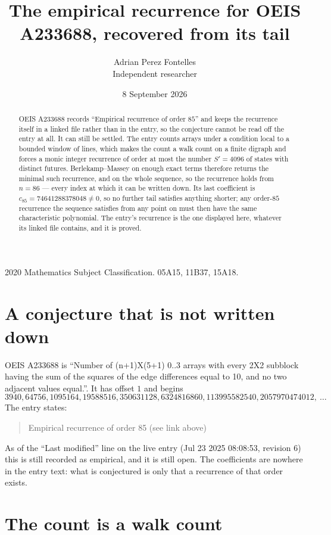 \documentclass[11pt,a4paper]{article}
\title{The empirical recurrence for OEIS A233688, recovered from its tail}
\author{Adrian Perez Fontelles\\ \small Independent researcher}
\date{8 September 2026}
\theoremstyle{plain}
\theoremstyle{definition}
\begin{document}
\maketitle

\begin{abstract}
OEIS A233688 records ``Empirical recurrence of order $85$'' and keeps the recurrence itself in
a linked file rather than in the entry, so the conjecture cannot be read off the entry at all.
It can still be settled. The entry counts arrays under a condition local to a bounded window of
lines, which makes the count a walk count on a finite digraph and forces a monic integer
recurrence of order at most the number $S'=4096$ of states with distinct futures. Berlekamp--Massey on
enough exact terms therefore returns the minimal such recurrence, and on the whole sequence, so the recurrence holds from $n=86$ --- every index at which it can be written down.
Its last coefficient is $c_{85}=74641288378048\neq0$, so no further tail satisfies anything
shorter; any order-$85$ recurrence the sequence satisfies from any point on must then have
the same characteristic polynomial. The entry's recurrence is the one displayed here, whatever
its linked file contains, and it is proved.
\end{abstract}

\noindent\small 2020 Mathematics Subject Classification. 05A15, 11B37, 15A18.\normalsize

\section{A conjecture that is not written down}

OEIS A233688 is ``Number of (n+1)X(5+1) 0..3 arrays with every 2X2 subblock having the sum of the squares of the edge differences equal to 10, and no two adjacent values equal.''. It has offset $1$ and begins
\[
3940, 64756, 1095164, 19588516, 350631128, 6324816860, 113995582540, 2057970474012,\ \dots
\]
The entry states:
\begin{quote}
Empirical recurrence of order 85 (see link above)
\end{quote}
As of the ``Last modified'' line on the live entry (Jul 23 2025 08:08:53, revision 6)
this is still recorded as empirical, and it is still open. The coefficients are nowhere in the
entry text: what is conjectured is only that a recurrence of that order exists.

\section{The count is a walk count}
\end{document}
